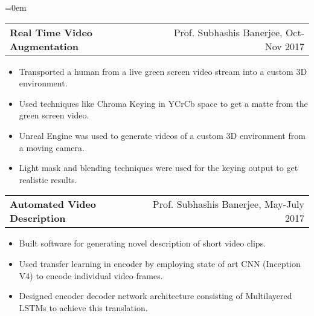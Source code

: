 \documentclass{article}
\makeatletter
\newcommand{\headerrow}[2]
{\begin{tabular*}{\linewidth}{l@{\extracolsep{\fill}}r}
	#1 &
	#2 \\
\end{tabular*}}
\makeatother
\begin{document}
\begin{list} {}{\leftmargin=0em}
    \item[]
    \headerrow {\textbf{Real Time Video Augmentation}}{Prof. Subhashis Banerjee, Oct-Nov 2017}
    \begin{itemize}
    \setlength\itemsep{0.0em}
	\item Transported a human from a live green screen video stream into a custom 3D environment.
	\item Used techniques like Chroma Keying in YCrCb space to get a matte from the green screen video.
	\item Unreal Engine was used to generate videos of a custom 3D environment from a moving camera.
	\item Light mask and blending techniques were used for the keying output to get realistic results.
    \end{itemize}
    \item[]
    \headerrow {\textbf{Automated Video Description}}{Prof. Subhashis Banerjee, May-July 2017}
    \begin{itemize}
    \setlength\itemsep{0.0em}
        \item Built software for generating novel description of short video clips.
        \item Used transfer learning in encoder by employing state of art CNN (Inception V4) to encode individual video frames.
        \item Designed encoder decoder network architecture consisting of Multilayered LSTMs to achieve this translation.
    \end{itemize}

\end{list}
\end{document}

